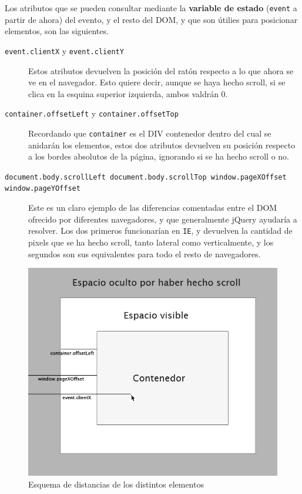 Los atributos que se pueden consultar mediante la \textbf{variable de estado} (\texttt{event} a partir de ahora) del evento, y el resto del DOM, y que son útilies para posicionar elementos, son las siguientes.

\begin{description}
  \item[\texttt{event.clientX} y \texttt{event.clientY}] Estos atributos devuelven la posición del ratón respecto a lo que ahora se ve en el navegador. Esto quiere decir, aunque se haya hecho scroll, si se clica en la esquina superior izquierda, ambos valdrán 0.
  \item[\texttt{container.offsetLeft} y \texttt{container.offsetTop}] Recordando que \texttt{container} es el DIV contenedor dentro del cual se anidarán los elementos, estos dos atributos devuelven su posición respecto a los bordes absolutos de la página, ignorando si se ha hecho scroll o no.
  \item[\texttt{document.body.scrollLeft document.body.scrollTop window.pageXOffset window.pageYOffset}] Este es un claro ejemplo de las diferencias comentadas entre el DOM ofrecido por diferentes navegadores, y que generalmente jQuery ayudaría a resolver. Los dos primeros funcionarían en \texttt{IE}, y devuelven la cantidad de pixels que se ha hecho scroll, tanto lateral como verticalmente, y los segundos son sus equivalentes para todo el resto de navegadores.
\end{description}


\begin{figure}[h!]
\centering
\includegraphics[width=\textwidth]{mouse_pointer.png}
\caption{Esquema de distancias de los distintos elementos}\label{fig:mouse_pointer}
\end{figure}

